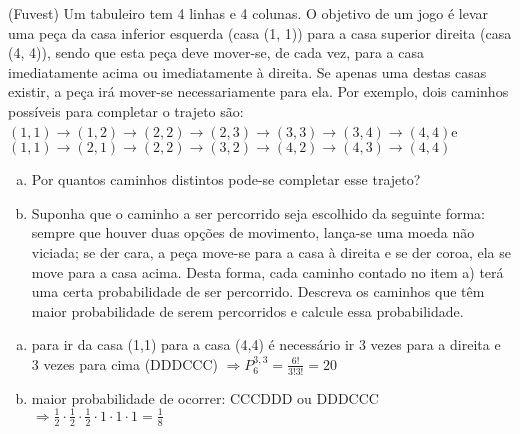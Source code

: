 \begin{ex}
 (Fuvest) Um tabuleiro tem 4 linhas e 4 colunas. O objetivo de um jogo é levar uma peça da casa inferior esquerda (casa (1, 1)) para a casa superior direita (casa (4, 4)), sendo que esta peça deve mover-se, de cada vez, para a casa imediatamente acima ou imediatamente à direita. Se apenas uma destas casas existir, a peça irá mover-se necessariamente para ela. Por exemplo, dois caminhos possíveis para completar o trajeto são:\newline $(1, 1)\rightarrow(1, 2)\rightarrow(2, 2)\rightarrow (2, 3)\rightarrow (3, 3)\rightarrow (3, 4)\rightarrow (4, 4)$\hspace{.4cm}e\hspace{.4cm} $(1, 1)\rightarrow (2, 1)\rightarrow (2, 2)\rightarrow (3, 2)\rightarrow (4, 2)\rightarrow (4, 3)\rightarrow (4, 4)$
 \begin{center}
 \end{center}
   \begin{enumerate}  [(a)]
       \item Por quantos caminhos distintos pode-se completar esse trajeto? 
       \item Suponha que o caminho a ser percorrido seja escolhido da seguinte forma: sempre que houver duas opções de movimento, lança-se uma moeda não viciada; se der cara, a peça move-se para a casa à direita e se der coroa, ela se move para a casa acima. Desta forma, cada caminho contado no item a) terá uma certa probabilidade de ser percorrido. Descreva os caminhos que têm maior probabilidade de serem percorridos e calcule essa probabilidade.
   \end{enumerate}
     \begin{sol}
     \phantom{A}
       \begin{enumerate} [(a)]
           \item para ir da casa (1,1) para a casa (4,4) é necessário ir 3 vezes para a direita e 3 vezes para cima (DDDCCC) $\Longrightarrow P^{3,3}_6 = \frac{6!}{3!3!}=20$
           \item maior probabilidade de ocorrer: CCCDDD ou DDDCCC $\Longrightarrow \frac{1}{2}\cdot\frac{1}{2}\cdot\frac{1}{2}\cdot1\cdot1\cdot1=\frac{1}{8}$
       \end{enumerate}
     \end{sol}
\end{ex}